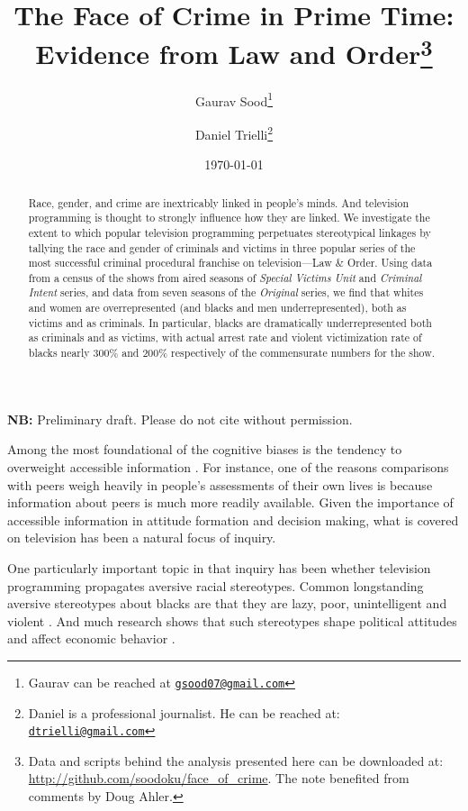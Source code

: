 \documentclass[12pt, letterpaper]{article}
\title{\Large{The Face of Crime in Prime Time:\\ Evidence from Law and Order}\footnote{Data and scripts behind the analysis presented here can be downloaded at: \url{http://github.com/soodoku/face_of_crime}. The note benefited from comments by Doug Ahler.}}
\author{Gaurav Sood\thanks{Gaurav can be reached at \href{mailto:gsood07@gmail.com}{\footnotesize{\texttt{gsood07@gmail.com}}}} \and Daniel Trielli\thanks{Daniel is a professional journalist. He can be reached at: \href{mailto:dtrielli@gmail.com}{\footnotesize{\texttt{dtrielli@gmail.com}}}}\vspace{.5cm}}
\date{\vspace{.5cm}\normalsize{\today}}
\begin{document}
\maketitle

\begin{center}
\vspace{.5cm}\textbf{NB:} Preliminary draft. Please do not cite without permission.\vspace{1.5cm}
\end{center}

\begin{abstract}
\noindent Race, gender, and crime are inextricably linked in people's minds. And television programming is thought to strongly influence how they are linked. We investigate the extent to which popular television programming perpetuates stereotypical linkages by tallying the race and gender of criminals and victims in three popular series of the most successful criminal procedural franchise on television---Law \& Order. Using data from a census of the shows from aired seasons of \textit{Special Victims Unit} and \textit{Criminal Intent} series, and data from seven seasons of the \textit{Original} series, we find that whites and women are overrepresented (and blacks and men underrepresented), both as victims and as criminals. In particular, blacks are dramatically underrepresented both as criminals and as victims, with actual arrest rate and violent victimization rate of blacks nearly 300\% and 200\% respectively of the commensurate numbers for the show. 
\end{abstract}
\clearpage
\doublespace

Among the most foundational of the cognitive biases is the tendency to overweight accessible information \citep{tversky1973availability, iyengar2010news, iyengar1990accessibility}. For instance, one of the reasons comparisons with peers weigh heavily in people's assessments of their own lives is because information about peers is much more readily available. Given the importance of accessible information in attitude formation and decision making, what is covered on television has been a natural focus of inquiry. 

One particularly important topic in that inquiry has been whether television programming propagates aversive racial stereotypes. Common longstanding aversive stereotypes about blacks are that they are lazy, poor, unintelligent and violent \citep{katz1933racial}. And much research shows that such stereotypes shape political attitudes \citep{sniderman1995scar, hurwitz1997public, peffley1997racial, dixon2006psychological} and affect economic behavior \citep{bertrand2004emily}. 
\end{document}
